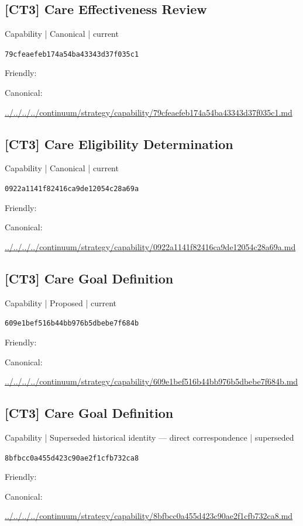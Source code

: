 \documentclass[10pt,a4paper]{article}
\begin{document}
\subsection*{[CT3] Care Effectiveness Review}
{\small Capability | Canonical | current}\par
\texttt{79cfeaefeb174a54ba43343d37f035c1}\par
Friendly: \par
Canonical: \par
{\footnotesize\url{../../../../continuum/strategy/capability/79cfeaefeb174a54ba43343d37f035c1.md}}\par
\subsection*{[CT3] Care Eligibility Determination}
{\small Capability | Canonical | current}\par
\texttt{0922a1141f82416ca9de12054c28a69a}\par
Friendly: \par
Canonical: \par
{\footnotesize\url{../../../../continuum/strategy/capability/0922a1141f82416ca9de12054c28a69a.md}}\par
\subsection*{[CT3] Care Goal Definition}
{\small Capability | Proposed | current}\par
\texttt{609e1bef516b44bb976b5dbebe7f684b}\par
Friendly: \par
Canonical: \par
{\footnotesize\url{../../../../continuum/strategy/capability/609e1bef516b44bb976b5dbebe7f684b.md}}\par
\subsection*{[CT3] Care Goal Definition}
{\small Capability | Superseded historical identity — direct correspondence | superseded}\par
\texttt{8bfbcc0a455d423c90ae2f1cfb732ca8}\par
Friendly: \par
Canonical: \par
{\footnotesize\url{../../../../continuum/strategy/capability/8bfbcc0a455d423c90ae2f1cfb732ca8.md}}\par
\end{document}
